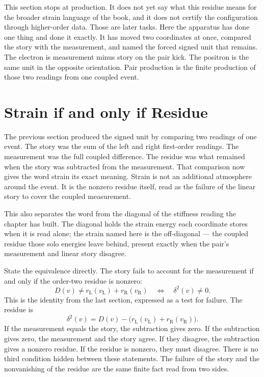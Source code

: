 This section stops at production. It does not yet say what this residue means
for the broader strain language of the book, and it does not certify the
configuration through higher-order data. Those are later tasks. Here the
apparatus has done one thing and done it exactly. It has moved two coordinates
at once, compared the story with the measurement, and named the forced signed
unit that remains. The electron is measurement minus story on the pair kick.
The positron is the same unit in the opposite orientation. Pair production is
the finite production of those two readings from one coupled event.

\section{Strain if and only if Residue}

The previous section produced the signed unit by comparing two readings of one
event. The story was the sum of the left and right first-order readings. The
measurement was the full coupled difference. The residue was what remained when
the story was subtracted from the measurement. That comparison now gives the
word strain its exact meaning. Strain is not an additional atmosphere around the
event. It is the nonzero residue itself, read as the failure of the linear story
to cover the coupled measurement.

This also separates the word from the diagonal of the stiffness reading the
chapter has built. The diagonal holds the strain energy each coordinate stores
when it is read alone; the strain named here is the off-diagonal --- the coupled
residue those solo energies leave behind, present exactly when the pair's
measurement and linear story disagree.

State the equivalence directly. The story fails to account for the measurement
if and only if the order-two residue is nonzero:
\[
  D(v) \neq r_{\mathrm{L}}(v_{\mathrm{L}}) + r_{\mathrm{R}}(v_{\mathrm{R}})
  \quad\Longleftrightarrow\quad
  \delta^2(v) \neq 0.
\]
This is the identity from the last section, expressed as a test for failure. The
residue is
\[
  \delta^2(v)
    = D(v)
      - \big(r_{\mathrm{L}}(v_{\mathrm{L}})
             + r_{\mathrm{R}}(v_{\mathrm{R}})\big).
\]
If the measurement equals the story, the subtraction gives zero. If the
subtraction gives zero, the measurement and the story agree. If they disagree,
the subtraction gives a nonzero residue. If the residue is nonzero, they must
disagree. There is no third condition hidden between these statements. The
failure of the story and the nonvanishing of the residue are the same finite
fact read from two sides.

